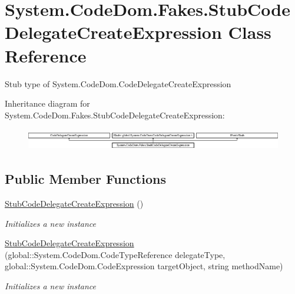 \hypertarget{class_system_1_1_code_dom_1_1_fakes_1_1_stub_code_delegate_create_expression}{\section{System.\-Code\-Dom.\-Fakes.\-Stub\-Code\-Delegate\-Create\-Expression Class Reference}
\label{class_system_1_1_code_dom_1_1_fakes_1_1_stub_code_delegate_create_expression}
}


Stub type of System.\-Code\-Dom.\-Code\-Delegate\-Create\-Expression 


Inheritance diagram for System.\-Code\-Dom.\-Fakes.\-Stub\-Code\-Delegate\-Create\-Expression\-:\begin{figure}[H]
\begin{center}
\leavevmode
\includegraphics[height=0.949958cm]{class_system_1_1_code_dom_1_1_fakes_1_1_stub_code_delegate_create_expression}
\end{center}
\end{figure}
\subsection*{Public Member Functions}
\begin{DoxyCompactItemize}
\item 
\hyperlink{class_system_1_1_code_dom_1_1_fakes_1_1_stub_code_delegate_create_expression_a340ab3b8810efc32b0d51c56e18e7919}{Stub\-Code\-Delegate\-Create\-Expression} ()
\begin{DoxyCompactList}\small\item\em Initializes a new instance\end{DoxyCompactList}\item 
\hyperlink{class_system_1_1_code_dom_1_1_fakes_1_1_stub_code_delegate_create_expression_a350294d2245c42e3bdc80c661cd77599}{Stub\-Code\-Delegate\-Create\-Expression} (global\-::\-System.\-Code\-Dom.\-Code\-Type\-Reference delegate\-Type, global\-::\-System.\-Code\-Dom.\-Code\-Expression target\-Object, string method\-Name)
\begin{DoxyCompactList}\small\item\em Initializes a new instance\end{DoxyCompactList}\end{DoxyCompactItemize}
